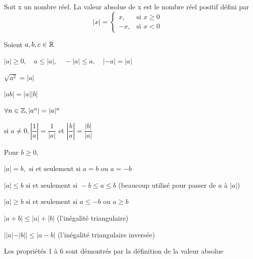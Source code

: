 \documentclass[a4paper, 12pt]{article}
\begin{document}
\begin{definition}
    Soit x un nombre réel. La valeur absolue de x est le nombre réel positif défini par
    \begin{equation}
        |x| =
        \begin{cases}
            x, & \text{si } x \geq 0 \\
            -x, & \text{si } x \lt 0
        \end{cases}
    \end{equation}
\end{definition}


\noindent
Soient $a, b, c \in \mathbb{R}$

\begin{proprietes}
    \item $|a| \geq 0, \quad a \leq |a|, \quad -|a| \leq a, \quad |-a| = |a|$
    \item $\sqrt{a^2} = |a|$
    \item $|ab| = |a||b|$
    \item $\forall n \in \mathbb{Z}, |a^n| = |a|^n$
    \item $\text{si } a \neq 0, |\dfrac{1}{a}|=\dfrac{1}{|a|} \text{ et } |\dfrac{b}{a}| = \dfrac{|b|}{|a|}$
    \item
        $\text{Pour } b \geq 0,$
        
        $|a| = b, \text{ si et seulement si } a = b \text{ ou } a = -b$
        
        $|a| \leq b \text{ si et seulement si } -b \leq a \leq b$ (beaucoup utilisé pour passer de $a$ à $|a|$)

        $|a| \geq b \text{ si et seulement si } a \leq -b \text{ ou } a \geq b$
    \item $|a + b| \leq |a| + |b|$ (l'inégalité triangulaire)
    \item $||a| - |b|| \leq |a - b|$ (l'inégalité triangulaire inversée)
\end{proprietes}

Les propriétés 1 à 6 sont démontrés par la définition de la valeur absolue
\end{document}
